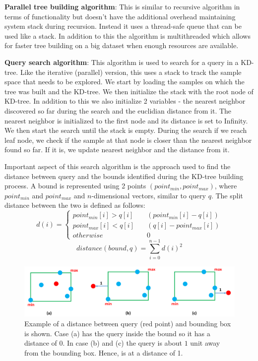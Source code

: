 \documentclass[11pt]{amsart}
\begin{document}
\vspace{5 mm}
\noindent\textbf{Parallel tree building algorithm}: This is similar to recursive algorithm in terms of functionality but doesn't have the additional overhead maintaining system stack during recursion. Instead it uses a thread-safe queue that can be used like a stack. In addition to this the algorithm is multithreaded which allows for faster tree building on a big dataset when enough resources are available.

\vspace{5 mm}
\noindent\textbf{Query search algorithm}: This algorithm is used to search for a query in a KD-tree. Like the iterative (parallel) version, this uses a stack to track the sample space that needs to be explored. We start by loading the samples on which the tree was built and the KD-tree. We then initialize the stack with the root node of KD-tree. In addition to this we also initialize 2 variables - the nearest neighbor discovered so far during the search and the euclidian distance from it. The nearest neighbor is initialized to the first node and its distance is set to Infinity. We then start the search until the stack is empty. During the search if we reach leaf node, we check if the sample at that node is closer than the nearest neighbor found so far. If it is, we update nearest neighbor and the distance from it.

Important aspect of this search algorithm is the approach used to find the distance between query and the bounds identified during the KD-tree building process. A bound is represented using 2 points $(point_{min}, point_{max})$, where $point_{min}$ and $point_{max}$ and $n$-dimensional vectors, similar to query $q$. The split distance between the two is defined as follows:
\[ d(i) =
  \begin{cases}
    point_{min}[i] > q[i]       & \quad (point_{min}[i] - q[i])\\
    point_{max}[i] < q[i]       & \quad (q[i] - point_{max}[i]) \\
    otherwise                      & \quad 0
  \end{cases}
\]
\[distance(bound, q) =  \sum_{i = 0}^{n-1} d(i)^{2}\]

\begin{figure}[t!]
\centering
\includegraphics[width=\linewidth]{images/bound_distance}
\caption{Example of a distance between query (red point) and bounding box is shown. Case (a) has the query inside the bound so it has a distance of 0. In case (b) and (c) the query is about $1$ unit away from the bounding box. Hence, is at a distance of 1.}
\label{fig:bound_distance}
\end{figure}
\end{document}
